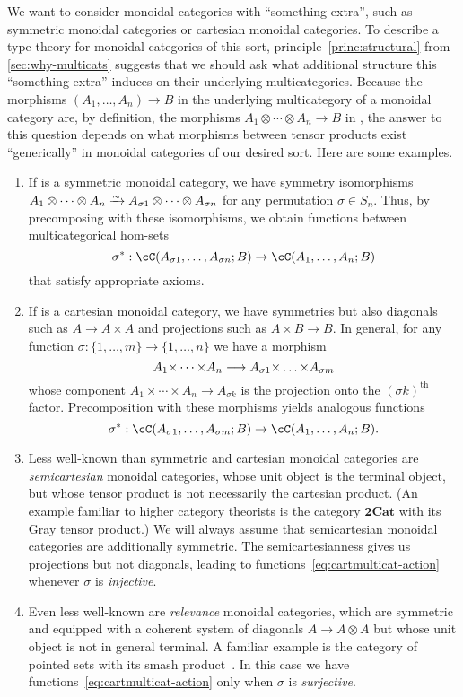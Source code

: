 \documentclass{book}
\let\tensor\otimes
\begin{document}
We want to consider monoidal categories with ``something extra'', such as symmetric monoidal categories or cartesian monoidal categories.
To describe a type theory for monoidal categories of this sort, principle~\eqref{princ:structural} from \cref{sec:why-multicats} suggests that we should ask what additional structure this ``something extra'' induces on their underlying multicategories.
Because the morphisms $(A_1,\dots,A_n) \to B$ in the underlying multicategory of a monoidal category \cC are, by definition, the morphisms $A_1\tensor\cdots\tensor A_n \to B$ in \cC, the answer to this question depends on what morphisms between tensor products exist ``generically'' in monoidal categories of our desired sort.
Here are some examples.
\begin{enumerate}
\item If \cC is a symmetric monoidal category, we have symmetry isomorphisms $A_1\tensor\cdots\tensor A_n\toiso A_{\sigma 1}\tensor\cdots\tensor A_{\sigma n}$ for any permutation $\sigma\in S_n$.
  Thus, by precomposing with these isomorphisms, we obtain functions between multicategorical hom-sets
  \begin{equation}
    \sigma^*: \cC(A_{\sigma 1},\dots,A_{\sigma n}; B) \to \cC(A_1,\dots,A_n;B)\label{eq:symm-multicat-action}
  \end{equation}
  that satisfy appropriate axioms.
\item If \cC is a cartesian monoidal category, we have symmetries but also diagonals such as $A\to A\times A$ and projections such as $A\times B \to B$.
  In general, for any function $\sigma : \{1,\dots,m\} \to \{1,\dots,n\}$ we have a morphism
  \[ A_1\times \cdots\times A_n \too A_{\sigma 1} \times\dots\times A_{\sigma m} \]
  whose component $A_1\times \cdots\times A_n \to A_{\sigma k}$ is the projection onto the $(\sigma k)^{\mathrm{th}}$ factor.
  Precomposition with these morphisms yields analogous functions
  \begin{equation}
    \sigma^*: \cC(A_{\sigma 1},\dots,A_{\sigma m}; B) \to \cC(A_1,\dots,A_n;B).\label{eq:cartmulticat-action}
  \end{equation}
\item Less well-known than symmetric and cartesian monoidal categories are \emph{semicartesian} monoidal categories, whose unit object is the terminal object, but whose tensor product is not necessarily the cartesian product.
  (An example familiar to higher category theorists is the category $\mathbf{2Cat}$ with its Gray tensor product.)
  We will always assume that semicartesian monoidal categories are additionally symmetric.
  The semicartesianness gives us projections but not diagonals, leading to functions~\eqref{eq:cartmulticat-action} whenever $\sigma$ is \emph{injective}.
\item Even less well-known are \emph{relevance} monoidal categories, which are symmetric and equipped with a coherent system of diagonals $A \to A\tensor A$ but whose unit object is not in general terminal.
  A familiar example is the category of pointed sets with its smash product~\cite{dp:relevant-cats}.
  In this case we have functions~\eqref{eq:cartmulticat-action} only when $\sigma$ is \emph{surjective}.
\end{enumerate}
\end{document}
